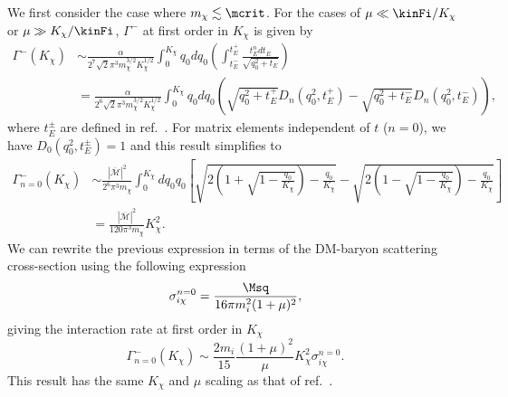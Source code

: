 We first consider the case where $m_\chi \lesssim \mcrit$. 
For the cases of $\mu \ll \kinFi/K_\chi$ or $\mu \gg K_\chi/\kinFi$, 
$\Gamma^{-}$ at first order in $K_\chi$ is given by
% 
\begin{align}
\Gamma^{-}(K_\chi) &\sim \frac{\alpha}{2^7\sqrt{2}\pi^3m_\chi^{3/2}K_\chi^{1/2}}\int_0^{K_\chi}q_0 dq_0 \left(\int_{t_{E}^{-}}^{t_{E}^{+}} \frac{t_E^n dt_E }{\sqrt{q_0^2+t_E}} \right)\\
&= \frac{\alpha}{2^6\sqrt{2}\pi^3m_\chi^{3/2}K_\chi^{1/2}}\int_0^{K_\chi}q_0 dq_0 \left(\sqrt{q_0^2+t_E^{+}}D_n(q_0^2,t_E^{+})-\sqrt{q_0^2+t_E^{-}}D_n(q_0^2,t_E^{-})\right), \label{eq:intratelowe}
\end{align}
% 
where $t_E^\pm$ are defined in ref.~\cite{Bell:2020jou_sep_ImprovedTreatmentDark}. 
For matrix elements independent of $t$ ($n=0$), we have $D_0(q_0^2,t_E^{\pm})=1$  and this result simplifies to
% 
\begin{align}
\Gamma_{n=0}^{-}(K_\chi) 
&\sim  \frac{|\overline{\mathcal{M}}|^2}{2^6\pi^3m_\chi}\int_{0}^{K_\chi} dq_0 q_0 \left[\sqrt{2\left(1+\sqrt{1-\frac{q_0}{K_\chi}}\right)-\frac{q_0}{K_\chi}}-\sqrt{2\left(1-\sqrt{1-\frac{q_0}{K_\chi}}\right)-\frac{q_0}{K_\chi}}\right] \nonumber \\
&= \frac{|\overline{\mathcal{M}}|^2}{120\pi^3m_\chi}K_\chi^2.
\end{align}
% 
We can rewrite the previous expression in terms of the DM-baryon scattering cross-section using the following expression
\begin{equation}
\sigma_{i\chi}^{n=0} = \frac{\Msq}{16\pi m_i^2 (1+\mu)^2}, 
\label{eq:intraten0}
\end{equation}
giving the interaction rate at first order in $K_\chi$
\begin{equation}
\Gamma_{n=0}^{-}(K_\chi)  \sim \frac{2 m_i}{15}\frac{(1+\mu)^2}{\mu}K_\chi^2 \sigma_{i\chi}^{n=0}.
\end{equation}
This result has the same $K_\chi$ and $\mu$ scaling as that of ref.~\cite{Bertoni:2013bsa_dec_DarkMatterThermalization}.



